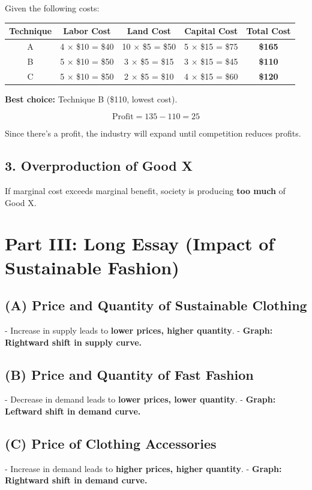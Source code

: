 \documentclass{article}
\begin{document}
Given the following costs:

\begin{center}
    \begin{tabular}{|c|c|c|c|c|}
        \hline
        Technique & Labor Cost & Land Cost & Capital Cost & Total Cost \\
        \hline
        A & 4 × \$10 = \$40 & 10 × \$5 = \$50 & 5 × \$15 = \$75 & \textbf{\$165} \\
        B & 5 × \$10 = \$50 & 3 × \$5 = \$15 & 3 × \$15 = \$45 & \textbf{\$110} \\
        C & 5 × \$10 = \$50 & 2 × \$5 = \$10 & 4 × \$15 = \$60 & \textbf{\$120} \\
        \hline
    \end{tabular}
\end{center}

\textbf{Best choice:} Technique B (\$110, lowest cost).

\[
\text{Profit} = 135 - 110 = 25
\]

Since there's a profit, the industry will expand until competition reduces profits.

\subsection*{3. Overproduction of Good X}

If marginal cost exceeds marginal benefit, society is producing \textbf{too much} of Good X.

\section*{Part III: Long Essay (Impact of Sustainable Fashion)}

\subsection*{(A) Price and Quantity of Sustainable Clothing}
- Increase in supply leads to \textbf{lower prices, higher quantity}.
- \textbf{Graph: Rightward shift in supply curve.}

\subsection*{(B) Price and Quantity of Fast Fashion}
- Decrease in demand leads to \textbf{lower prices, lower quantity}.
- \textbf{Graph: Leftward shift in demand curve.}

\subsection*{(C) Price of Clothing Accessories}
- Increase in demand leads to \textbf{higher prices, higher quantity}.
- \textbf{Graph: Rightward shift in demand curve.}
\end{document}
